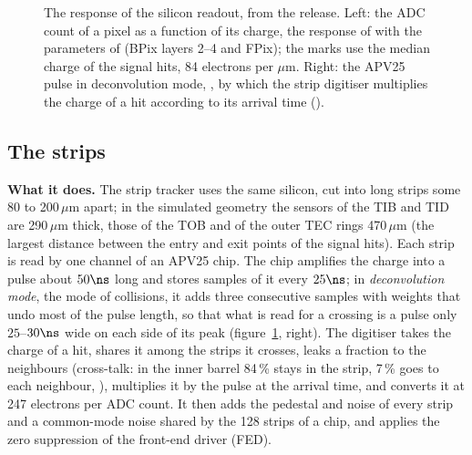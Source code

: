 \begin{figure}[!htb]
\caption{The response of the silicon readout, from the release. Left: the ADC count of a pixel as a function of its
charge, the response of  with the parameters of
 (BPix layers 2--4 and FPix); the marks use the median charge of the signal hits,
84 electrons per $\mu$m. Right: the APV25 pulse in deconvolution mode, ,
by which the strip digitiser multiplies the charge of a hit according to its arrival time
().}
\label{fig:11_si}
\end{figure}

\subsection{The strips}
\label{sec:11_strip}

\textbf{What it does.} The strip tracker uses the same silicon, cut into long strips some 80 to 200\,$\mu$m apart; in the
simulated geometry the sensors of the TIB and TID are 290\,$\mu$m thick, those of the TOB and of the outer TEC rings
470\,$\mu$m (the largest distance between the entry and exit points of the signal hits). Each strip is read by one
channel of an APV25 chip. The chip amplifies the charge into a pulse about $50\ns$ long and stores samples of it every
$25\ns$; in \emph{deconvolution mode}, the mode of collisions, it adds three consecutive samples with weights that undo
most of the pulse length, so that what is read for a crossing is a pulse only $25$--$30\ns$ wide on each side of its
peak (figure~\ref{fig:11_si}, right). The digitiser takes the charge of a hit, shares it among the strips it crosses,
leaks a fraction to the neighbours (cross-talk: in the inner barrel 84\,\% stays in the strip, 7\,\% goes to each
neighbour, ), multiplies it by the pulse at the arrival time, and converts it at
247 electrons per ADC count. It then adds the pedestal and noise of every strip and a common-mode noise shared by the
128 strips of a chip, and applies the zero suppression of the front-end driver (FED).


